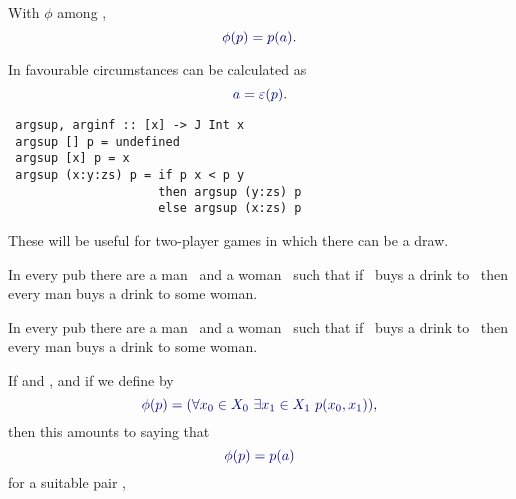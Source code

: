\documentclass%
[%
Screen4to3,
]{foils}
\begin{document}


With $\phi$ among \darkblue{$\exists, \forall, \sup, \inf, \int, \dots$}, 
\[
\darkblue{\phi(p) = p(a)}.
\]

In favourable circumstances  can be calculated as 
\[ \darkblue{a =\varepsilon(p)}.\] 






\begin{verbatim}
 argsup, arginf :: [x] -> J Int x
 argsup [] p = undefined
 argsup [x] p = x
 argsup (x:y:zs) p = if p x < p y 
                     then argsup (y:zs) p 
                     else argsup (x:zs) p
\end{verbatim}
These will be useful for two-player games in which there
can be a draw.


In every pub there are a man~ and a
woman~ such that if~ buys a drink
to~ then every man buys a drink to some woman.

\vfill


In every pub there are a man~ and a
woman~ such that if~ buys a drink
to~ then every man buys a drink to some woman.

\vfill


If  and , and if we define %
\darkblue{$\phi = \forall \otimes \exists$} by
\[
\darkblue{\phi(p) = \left(\forall x_0 \in X_0 \,\, \exists x_1 \in X_1 \,\, p(x_0,x_1)\right)},
\]
then this amounts to saying that
\[
\darkblue{\phi(p) = p(a)}
\]
for a suitable pair ,
\end{document}
